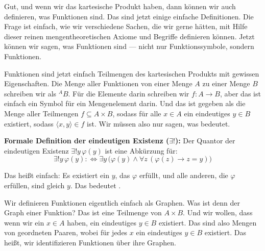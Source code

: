 \begin{spoken-clean}[00:57:37 - 00:59:51]
Gut, und wenn wir das kartesische Produkt haben, dann können wir auch definieren, was Funktionen sind. Das sind jetzt einige einfache Definitionen. Die Frage ist einfach, wie wir verschiedene Sachen, die wir gerne hätten, mit Hilfe dieser reinen mengentheoretischen Axiome und Begriffe definieren können. Jetzt können wir sagen, was Funktionen sind --- nicht nur Funktionssymbole, sondern Funktionen.

Funktionen sind jetzt einfach Teilmengen des kartesischen Produkts mit gewissen Eigenschaften. Die Menge aller Funktionen von einer Menge $A$ zu einer Menge $B$ schreiben wir als ${}^A B$. Für die Elemente darin schreiben wir $f \colon A \to B$, aber das ist einfach ein Symbol für ein Mengenelement darin. Und das ist gegeben als die Menge aller Teilmengen $f \subseteq A \times B$, sodass für alle $x \in A$ ein eindeutiges $y \in B$ existiert, sodass $\langle x, y \rangle \in f$ ist. Wir müssen also nur sagen, was  bedeutet.
\end{spoken-clean}

\begin{math-stroke}

\textbf{Formale Definition der eindeutigen Existenz ($\exists!$):}
Der Quantor der eindeutigen Existenz $\exists! y \, \varphi(y)$ ist eine Abkürzung für:
\[
\exists! y \, \varphi(y) :\iff \exists y \, \bigl( \varphi(y) \land \forall z \, (\varphi(z) \rightarrow z = y) \bigr)
\]
\end{math-stroke}

\begin{spoken-clean}[01:02:05 - 01:02:54]
Das heißt einfach: Es existiert ein $y$, das $\varphi$ erfüllt, und alle anderen, die $\varphi$ erfüllen, sind gleich $y$. Das bedeutet .

Wir definieren Funktionen eigentlich einfach als Graphen. Was ist denn der Graph einer Funktion? Das ist eine Teilmenge von $A \times B$. Und wir wollen, dass wenn wir ein $x \in A$ haben, ein eindeutiges $y \in B$ existiert. Das sind also Mengen von geordneten Paaren, wobei für jedes $x$ ein eindeutiges $y \in B$ existiert. Das heißt, wir identifizieren Funktionen über ihre Graphen.
\end{spoken-clean}

